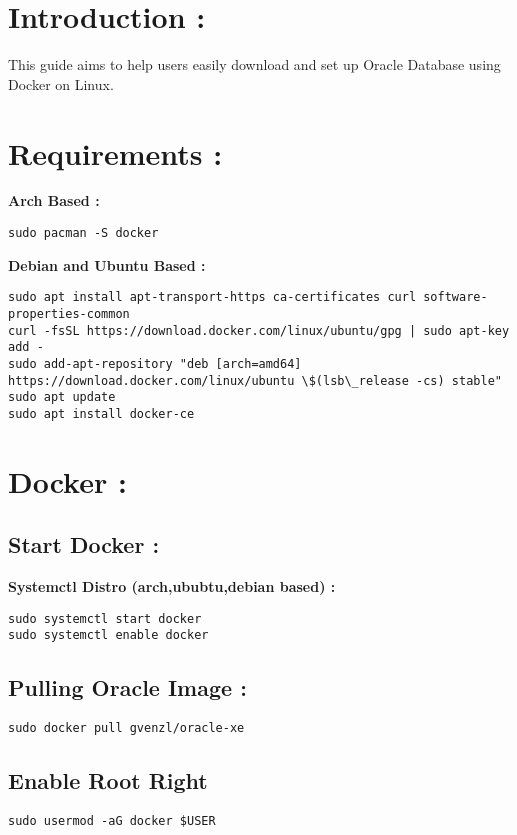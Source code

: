 \documentclass{article}
\begin{document}
\section{Introduction : }
This guide aims to help users easily download and set up Oracle Database using Docker on Linux.
\section{Requirements : }
\begin{tcolorbox}[title = Installing Docker]
    \textbf{Arch Based : }

    \begin{verbatim}
sudo pacman -S docker
   \end{verbatim}

    \textbf{Debian and Ubuntu Based :}
    \begin{verbatim}
sudo apt install apt-transport-https ca-certificates curl software-properties-common
curl -fsSL https://download.docker.com/linux/ubuntu/gpg | sudo apt-key add -
sudo add-apt-repository "deb [arch=amd64] https://download.docker.com/linux/ubuntu \$(lsb\_release -cs) stable"
sudo apt update
sudo apt install docker-ce
 \end{verbatim}
\end{tcolorbox}
\section{Docker : }
\subsection{Start Docker :}
\begin{tcolorbox}[title = starting docker]
    \textbf{Systemctl Distro (arch,ububtu,debian based) :}
\begin{verbatim}
sudo systemctl start docker
sudo systemctl enable docker
\end{verbatim}
\end{tcolorbox}
\subsection{Pulling Oracle Image :}
\begin{tcolorbox}[title = Pulling oracle-xe]
\begin{verbatim}
sudo docker pull gvenzl/oracle-xe
\end{verbatim}

\end{tcolorbox}
\subsection{Enable Root Right}
\begin{tcolorbox}
\begin{verbatim}
sudo usermod -aG docker $USER
\end{verbatim}   
\end{tcolorbox}
\end{document}
